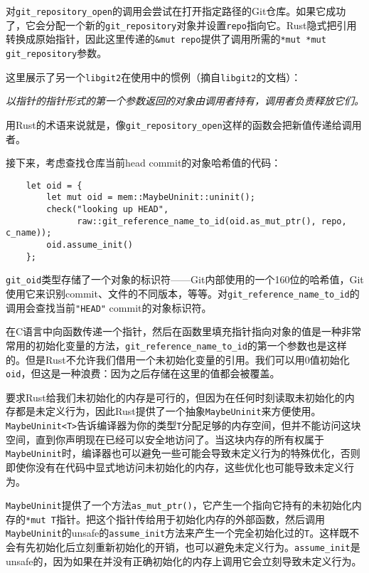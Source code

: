 对\texttt{git\_repository\_open}的调用会尝试在打开指定路径的Git仓库。如果它成功了，它会分配一个新的\texttt{git\_repository}对象并设置\texttt{repo}指向它。Rust隐式把引用转换成原始指针，因此这里传递的\texttt{\&mut repo}提供了调用所需的\texttt{*mut *mut git_repository}参数。

这里展示了另一个\texttt{libgit2}在使用中的惯例（摘自\texttt{libgit2}的文档）：

\emph{以指针的指针形式的第一个参数返回的对象由调用者持有，调用者负责释放它们。}

用Rust的术语来说就是，像\texttt{git\_repository\_open}这样的函数会把新值传递给调用者。

接下来，考虑查找仓库当前head commit的对象哈希值的代码：
\begin{verbatim}
    let oid = {
        let mut oid = mem::MaybeUninit::uninit();
        check("looking up HEAD",
              raw::git_reference_name_to_id(oid.as_mut_ptr(), repo, c_name));
        oid.assume_init()
    };
\end{verbatim}

\texttt{git\_oid}类型存储了一个对象的标识符——Git内部使用的一个160位的哈希值，Git使用它来识别commit、文件的不同版本，等等。对\texttt{git\_reference\_name\_to\_id}的调用会查找当前\texttt{"HEAD"} commit的对象标识符。

在C语言中向函数传递一个指针，然后在函数里填充指针指向对象的值是一种非常常用的初始化变量的方法，\texttt{git\_reference\_name\_to\_id}的第一个参数也是这样的。但是Rust不允许我们借用一个未初始化变量的引用。我们可以用0值初始化\texttt{oid}，但这是一种浪费：因为之后存储在这里的值都会被覆盖。

要求Rust给我们未初始化的内存是可行的，但因为在任何时刻读取未初始化的内存都是未定义行为，因此Rust提供了一个抽象\texttt{MaybeUninit}来方便使用。\texttt{MaybeUninit<T>}告诉编译器为你的类型\texttt{T}分配足够的内存空间，但并不能访问这块空间，直到你声明现在已经可以安全地访问了。当这块内存的所有权属于\texttt{MaybeUninit}时，编译器也可以避免一些可能会导致未定义行为的特殊优化，否则即使你没有在代码中显式地访问未初始化的内存，这些优化也可能导致未定义行为。

\texttt{MaybeUninit}提供了一个方法\texttt{as\_mut\_ptr()}，它产生一个指向它持有的未初始化内存的\texttt{*mut T}指针。把这个指针传给用于初始化内存的外部函数，然后调用\texttt{MaybeUninit}的unsafe的\texttt{assume\_init}方法来产生一个完全初始化过的\texttt{T}。这样既不会有先初始化后立刻重新初始化的开销，也可以避免未定义行为。\texttt{assume\_init}是unsafe的，因为如果在并没有正确初始化的内存上调用它会立刻导致未定义行为。

